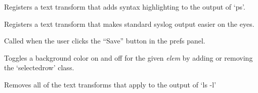 \documentclass[letterpaper,10pt,openany]{sphinxmanual}
\begin{document}
\begin{fulllineitems}
\begin{fulllineitems}
\end{fulllineitems}



\begin{fulllineitems}
\label{Applications/terminal/plugin_convenience:GateOne.Convenience.registerPSConvenience}
Registers a text transform that adds syntax highlighting to the output of `ps'.

\end{fulllineitems}



\begin{fulllineitems}
\label{Applications/terminal/plugin_convenience:GateOne.Convenience.registerSyslogConvenience}
Registers a text transform that makes standard syslog output easier on the eyes.

\end{fulllineitems}



\begin{fulllineitems}
\label{Applications/terminal/plugin_convenience:GateOne.Convenience.savePrefsCallback}
Called when the user clicks the ``Save'' button in the prefs panel.

\end{fulllineitems}



\begin{fulllineitems}
\label{Applications/terminal/plugin_convenience:GateOne.Convenience.toggleBackground}
Toggles a background color on and off for the given \emph{elem} by adding or removing the `selectedrow' class.

\end{fulllineitems}



\begin{fulllineitems}
\label{Applications/terminal/plugin_convenience:GateOne.Convenience.unregisterLSConvenience}
Removes all of the text transforms that apply to the output of `ls -l'

\end{fulllineitems}




\end{fulllineitems}
\end{document}
